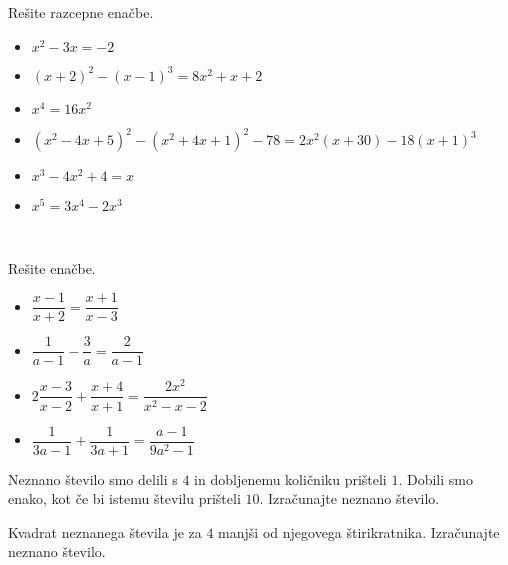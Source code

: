         
            \begin{naloga}
                Rešite razcepne enačbe.
                \begin{itemize}
                        \item $x^2-3x=-2$ 
                        \item $(x+2)^2-(x-1)^3=8x^2+x+2$ 
                        \item $x^4=16x^2$ 
                        \item $(x^2-4x+5)^2-(x^2+4x+1)^2-78=2x^2(x+30)-18(x+1)^3$ 
                        \item $x^3-4x^2+4=x$ 
                        \item $x^5=3x^4-2x^3$ 
                \end{itemize}
            \end{naloga}
        

~~\\
        
            \begin{naloga}
                Rešite enačbe.
                \begin{itemize}
                        \item $\dfrac{x-1}{x+2}=\dfrac{x+1}{x-3}$ 
                        \item $\dfrac{1}{a-1}-\dfrac{3}{a}=\dfrac{2}{a-1}$ 
                        \item $2\dfrac{x-3}{x-2}+\dfrac{x+4}{x+1}=\dfrac{2x^2}{x^2-x-2}$ 
                        \item $\dfrac{1}{3a-1}+\dfrac{1}{3a+1}=\dfrac{a-1}{9a^2-1}$ 
                \end{itemize}
            \end{naloga}
        


        
            \begin{naloga}
                Neznano število smo delili s $4$ in dobljenemu količniku prišteli $1$. 
                Dobili smo enako, kot če bi istemu številu prišteli $10$. Izračunajte neznano število.
                
            \end{naloga}

            \begin{naloga}
                Kvadrat neznanega števila je za $4$ manjši od njegovega štirikratnika. Izračunajte neznano število.
                
            \end{naloga}

